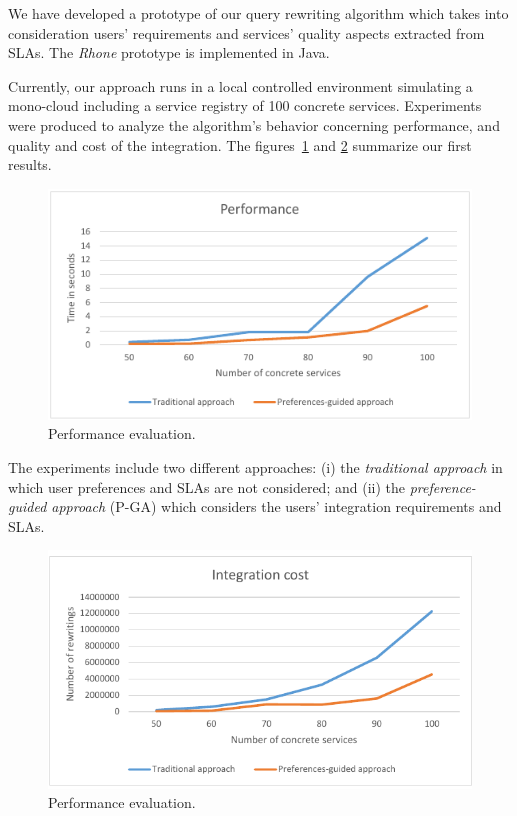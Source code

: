 We have developed a prototype of our query rewriting algorithm which takes into consideration users' requirements and services' quality aspects extracted from SLAs. The \textit{Rhone} prototype is implemented in Java.

Currently, our approach runs in a local controlled environment simulating a mono-cloud including a service registry of 100 concrete services. 
Experiments were produced to analyze the algorithm's behavior concerning performance, and quality and cost of the integration. The figures~\ref{fig01} and \ref{fig02} summarize our first results.

\begin{figure}[!h]
\centering
\includegraphics[scale=0.8]{fig1.pdf}
\caption{Performance evaluation.}\label{fig01}
\end{figure} 

The experiments include two different approaches: (i) the \textit{traditional approach} in which user preferences and SLAs are not considered; and (ii) the \textit{preference-guided approach} (P-GA) which considers the users' integration requirements and SLAs.

\begin{figure}[!h]
\centering
\includegraphics[scale=0.72]{fig2.pdf}
\caption{Performance evaluation.}\label{fig02}
\end{figure} 


